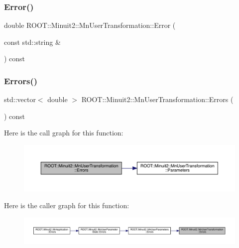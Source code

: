 \subsubsection{\texorpdfstring{Error()}{Error()}\hspace{0.1cm}{\footnotesize\ttfamily [6/6]}}
{\footnotesize\ttfamily double R\+O\+O\+T\+::\+Minuit2\+::\+Mn\+User\+Transformation\+::\+Error (\begin{DoxyParamCaption}\item[{const std\+::string \&}]{ }\end{DoxyParamCaption}) const}

\mbox{\label{classROOT_1_1Minuit2_1_1MnUserTransformation_a7920b97096b486b27a4a020894677500}} 
\subsubsection{\texorpdfstring{Errors()}{Errors()}\hspace{0.1cm}{\footnotesize\ttfamily [1/3]}}
{\footnotesize\ttfamily std\+::vector$<$ double $>$ R\+O\+O\+T\+::\+Minuit2\+::\+Mn\+User\+Transformation\+::\+Errors (\begin{DoxyParamCaption}{ }\end{DoxyParamCaption}) const}

Here is the call graph for this function\+:
\nopagebreak
\begin{figure}[H]
\begin{center}
\leavevmode
\includegraphics[width=350pt]{d9/d98/classROOT_1_1Minuit2_1_1MnUserTransformation_a7920b97096b486b27a4a020894677500_cgraph}
\end{center}
\end{figure}
Here is the caller graph for this function\+:
\nopagebreak
\begin{figure}[H]
\begin{center}
\leavevmode
\includegraphics[width=350pt]{d9/d98/classROOT_1_1Minuit2_1_1MnUserTransformation_a7920b97096b486b27a4a020894677500_icgraph}
\end{center}
\end{figure}
\mbox{\label{classROOT_1_1Minuit2_1_1MnUserTransformation_af2da240e2a8273a63493847ab518288c}} 
